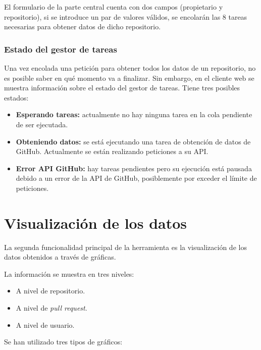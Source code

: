 El formulario de la parte central cuenta con dos campos (propietario y repositorio), si se introduce un par de valores válidos, se encolarán las 8 tareas necesarias para obtener datos de dicho repositorio.


\subsubsection{Estado del gestor de tareas}

Una vez encolada una petición para obtener todos los datos de un repositorio, no es posible saber en qué momento va a finalizar. Sin embargo, en el cliente web se muestra información sobre el estado del gestor de tareas. Tiene tres posibles estados:

\begin{itemize}
\tightlist
	\item \textbf{Esperando tareas:} actualmente no hay ninguna tarea en la cola pendiente de ser ejecutada.
	\item \textbf{Obteniendo datos:} se está ejecutando una tarea de obtención de datos de GitHub. Actualmente se están realizando peticiones a su API.
	\item \textbf{Error API GitHub:} hay tareas pendientes pero su ejecución está pausada debido a un error de la API de GitHub, posiblemente por exceder el límite de peticiones.
\end{itemize}


\section{Visualización de los datos}

La segunda funcionalidad principal de la herramienta es la visualización de los datos obtenidos a través de gráficas.

La información se muestra en tres niveles:

\begin{itemize}
	\item A nivel de repositorio.
	\item A nivel de \emph{pull request}.
	\item A nivel de usuario.
\end{itemize}

Se han utilizado tres tipos de gráficos:

